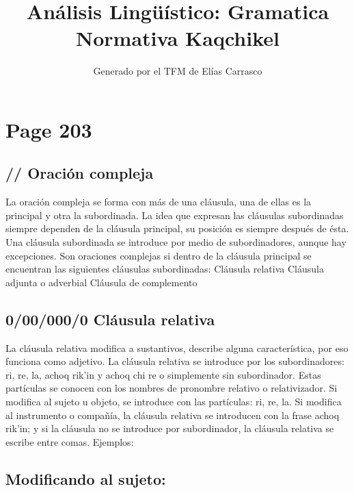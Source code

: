 \documentclass{article}%
\title{Análisis Lingüístico: Gramatica Normativa Kaqchikel}%
\author{Generado por el TFM de Elías Carrasco}%
\begin{document}
%
\normalsize%
\maketitle%
\section{Page 203}%
\label{sec:Page203}%
\subsection{// Oración compleja}%
\label{subsec://Oracincompleja}%

%
La oración compleja se forma con más de una cláusula, una de ellas es la principal y %
otra la subordinada. La idea que expresan las cláusulas subordinadas siempre dependen %
de la cláusula principal, su posición es siempre después de ésta. Una cláusula subordinada %
se introduce por medio de subordinadores, aunque hay excepciones. Son oraciones %
complejas si dentro de la cláusula principal se encuentran las siguientes cláusulas %
subordinadas: %
Cláusula relativa %
Cláusula adjunta o adverbial %
Cláusula de complemento %
\subsection{0/00/000/0 Cláusula relativa}%
\label{subsec:0/00/000/0Clusularelativa}%

%
La cláusula relativa modifica a sustantivos, describe alguna característica, por eso %
funciona como adjetivo. La cláusula relativa se introduce por los subordinadores: ri, %
re, la, achoq rik'in y achoq chi re o simplemente sin subordinador. Estas partículas se %
conocen con los nombres de pronombre relativo o relativizador. Si modifica al sujeto u %
objeto, se introduce con las partículas: ri, re, la. Si modifica al instrumento o compañía, %
la cláusula relativa se introducen con la frase achoq rik'in; y si la cláusula no se %
introduce por subordinador, la cláusula relativa se escribe entre comas. Ejemplos: %
\subsection{Modificando al sujeto:}%
\label{subsec:Modificandoalsujeto}%
\end{document}
